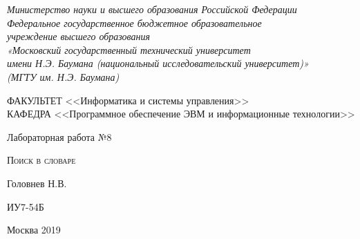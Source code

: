 \documentclass[a4paper,12pt]{article}
\begin{document}

\begin{titlepage}
\newpage

\begin{center}

\textit{Министерство науки и высшего образования Российской Федерации \\ 
Федеральное государственное бюджетное образовательное \\
учреждение высшего образования \\
«Московский государственный технический университет \\
имени Н.Э. Баумана (национальный исследовательский университет)» \\
(МГТУ им. Н.Э. Баумана) \\}
\hrulefill
\end{center}

\vspace{2em}

\begin{flushleft}
ФАКУЛЬТЕТ <<Информатика и системы управления>> \\
\vspace{0.5em}
КАФЕДРА <<Программное обеспечение ЭВМ и информационные технологии>>
\end{flushleft}


\vspace{8em}

\begin{center}
\LARGE Лабораторная работа №8 \\
\end{center}

\vspace{1.5em}

\begin{center}
\textsc{Поиск в словаре}
\end{center}

\vspace{6em}

\begin{center}
Головнев Н.В.

\vspace{4em}

ИУ7-54Б
\end{center}

\vspace{\fill}

\begin{center}
Москва 2019
\end{center}

\end{titlepage}
\end{document}
